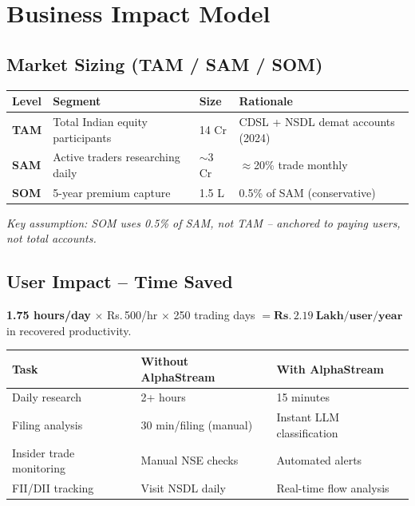 \documentclass[11pt, a4paper]{article}
\newcommand{\Rs}{Rs.\,}
\begin{document}
\section{Business Impact Model}
\label{sec:impact}

\subsection{Market Sizing (TAM / SAM / SOM)}

\begin{center}
\small
\begin{tabular}{L{1.5cm} L{5cm} C{2.5cm} L{4.5cm}}
  \toprule
  \textbf{Level} & \textbf{Segment} & \textbf{Size} & \textbf{Rationale} \\
  \midrule
  \textbf{TAM} & Total Indian equity participants & 14 Cr & CDSL + NSDL demat accounts (2024) \\
  \textbf{SAM} & Active traders researching daily & $\sim$3 Cr & $\approx$20\% trade monthly \\
  \textbf{SOM} & 5-year premium capture & 1.5 L & 0.5\% of SAM (conservative) \\
  \bottomrule
\end{tabular}
\end{center}

\noindent
\small\textit{Key assumption: SOM uses 0.5\% of SAM, not TAM -- anchored to paying users, not total accounts.}

\subsection{User Impact -- Time Saved}

\begin{greenbox}[title={Time Value Recovered Per User}]
\textbf{1.75 hours/day} $\times$ \Rs{}500/hr $\times$ 250 trading days
$= \mathbf{\Rs{}2.19\ Lakh/user/year}$ in recovered productivity.
\end{greenbox}

\begin{center}
\small
\begin{tabular}{L{4cm} L{3.5cm} L{3.5cm}}
  \toprule
  \textbf{Task} & \textbf{Without AlphaStream} & \textbf{With AlphaStream} \\
  \midrule
  Daily research          & 2+ hours         & 15 minutes \\
  Filing analysis         & 30 min/filing (manual) & Instant LLM classification \\
  Insider trade monitoring& Manual NSE checks & Automated alerts \\
  FII/DII tracking        & Visit NSDL daily  & Real-time flow analysis \\
  \bottomrule
\end{tabular}
\end{center}
\end{document}
